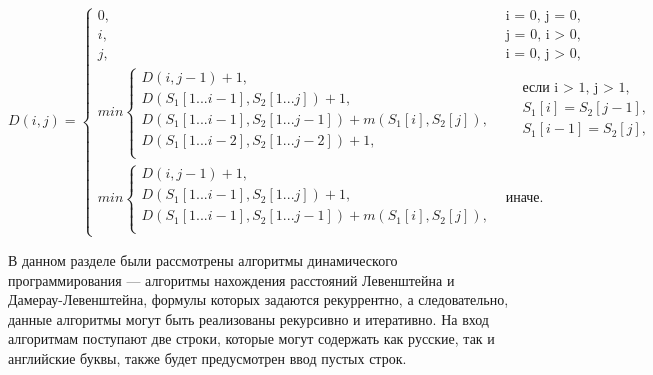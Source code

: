 \begin{equation}
	\label{eq:DL}
	D(i, j) = 
	\begin{cases}
		0, &\text{i = 0, j = 0,}\\
		i, &\text{j = 0, i > 0,}\\
		j, &\text{i = 0, j > 0,}\\
		min \begin{cases}
			D(i, j - 1) + 1,\\
			D(S_{1}[1...i-1], S_{2}[1...j]) + 1,\\
			D(S_{1}[1...i-1], S_{2}[1...j-1]) + m(S_{1}[i], S_{2}[j]), \\
			D(S_{1}[1...i-2], S_{2}[1...j-2]) + 1, \\
		\end{cases}
		& \begin{aligned}
			& \text{если i > 1, j > 1}, \\
			& S_{1}[i] = S_{2}[j - 1], \\
			& S_{1}[i - 1] = S_{2}[j], \\
		\end{aligned}\\
		min \begin{cases}
			D(i, j - 1) + 1,\\
			D(S_{1}[1...i-1], S_{2}[1...j]) + 1, \\
			D(S_{1}[1...i-1], S_{2}[1...j-1]) + m(S_{1}[i], S_{2}[j]), \\
		\end{cases}
		 & \text{иначе.}
	\end{cases}
\end{equation}


В данном разделе были рассмотрены алгоритмы динамического программирования --- алгоритмы нахождения расстояний Левенштейна и Дамерау-Левенштейна, формулы которых задаются рекуррентно, а следовательно, данные алгоритмы могут быть реализованы рекурсивно и итеративно. На вход алгоритмам поступают две строки, которые могут содержать как русские, так и английские буквы, также будет предусмотрен ввод пустых строк.
